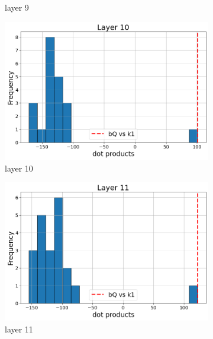 \documentclass[11pt]{article}
\begin{document}
\begin{figure}[t]
\begin{subfigure}[t]{0.24\textwidth}
    \caption{layer 9}
  \end{subfigure}\hfill
    \vspace{2mm}
    
    \begin{subfigure}[t]{0.24\textwidth}
    \centering
    \includegraphics[width=1.4\columnwidth]{figures/obs1_appendix/obs1_layer10.png}
    \caption{layer 10}
  \end{subfigure}\hfill
    \begin{subfigure}[t]{0.24\textwidth}
    \centering
    \includegraphics[width=1.4\columnwidth]{figures/obs1_appendix/obs1_layer11.png}
    \caption{layer 11}
  \end{subfigure}\hfill
  \begin{subfigure}[t]{0.24\textwidth}
    \centering

\end{subfigure}
\end{figure}
\end{document}
